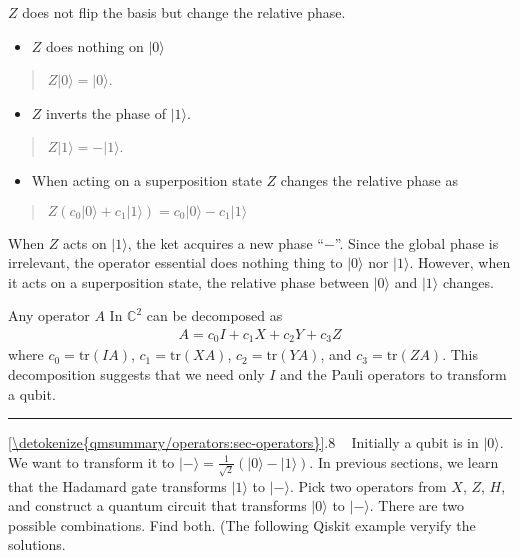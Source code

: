 \documentclass[letterpaper,10pt,english]{jupyterBook}
\begin{document}
\sphinxAtStartPar
\(Z\) does not flip the basis but change the relative phase.
\begin{itemize}
\item {}
\sphinxAtStartPar
\(Z\) does nothing on \(|0\rangle\)

\end{itemize}
\begin{quote}

\sphinxAtStartPar
\(Z |0\rangle = |0\rangle\).
\end{quote}
\begin{itemize}
\item {}
\sphinxAtStartPar
\(Z\) inverts the phase of \(|1\rangle\).

\end{itemize}
\begin{quote}

\sphinxAtStartPar
\(Z |1\rangle = - |1\rangle\).
\end{quote}
\begin{itemize}
\item {}
\sphinxAtStartPar
When acting on a superposition state \(Z\) changes the relative phase as

\end{itemize}
\begin{quote}

\sphinxAtStartPar
\(Z \left(c_0|0\rangle + c_1 |1\rangle\right) = c_0|0\rangle - c_1|1\rangle\)
\end{quote}

\sphinxAtStartPar
When \(Z\) acts on \(|1\rangle\), the ket acquires a new phase “\(-\)”. Since the global phase is irrelevant, the operator essential does nothing thing to \(|0\rangle\) nor \(|1\rangle\). However, when it acts on a superposition state, the relative phase between \(|0\rangle\) and \(|1\rangle\) changes.

\sphinxAtStartPar
Any operator \(A\) In \(\mathbb{C}^2\) can be decomposed as
\begin{equation*}
\begin{split}
A = c_0 I + c_1 X + c_2 Y + c_3 Z
\end{split}
\end{equation*}
\sphinxAtStartPar
where \(c_0 = \text{tr}(I A)\), \(c_1 = \text{tr}(X A)\), \(c_2 = \text{tr}(Y A)\), and \(c_3 = \text{tr}(Z A)\).  This decomposition suggests that we need only \(I\) and the Pauli operators to transform a qubit.


\bigskip\hrule\bigskip


\sphinxAtStartPar
{} \hyperref[\detokenize{qmsummary/operators:sec-operators}]{\ref{\detokenize{qmsummary/operators:sec-operators}}}.8     Initially a qubit is in \(|0\rangle\). We want to transform it to \(|-\rangle = \frac{1}{\sqrt{2}} \left(|0\rangle - |1\rangle\right)\). In previous sections, we learn that the Hadamard gate transforms \(|1\rangle\) to \(|-\rangle\). Pick two operators from \(X\), \(Z\), \(H\), and construct a quantum circuit that transforms \(|0\rangle\) to \(|-\rangle\).  There are two possible combinations. Find both.  (The following Qiskit example veryify the solutions.
\end{document}

